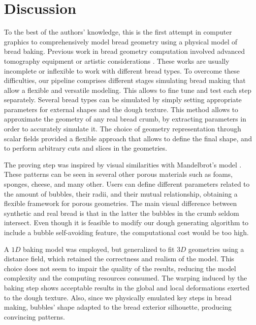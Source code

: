\section{Discussion}

To the best of the authors' knowledge, this is the first attempt in computer graphics to comprehensively model bread geometry using a physical model of bread baking.
Previous work in bread geometry computation involved advanced tomography equipment \cite{VanDyck2014} or artistic considerations \cite{Xenakis2007}.
These works are usually incomplete or inflexible to work with different bread types.
To overcome these difficulties, our pipeline comprises different stages simulating bread making that allow a flexible and versatile modeling. 
This allows to fine tune and test each step separately.
Several bread types can be simulated by simply setting appropriate parameters for external shapes and the dough texture.
This method allows to approximate the geometry of any real bread crumb, by 
extracting parameters in order to accurately simulate it.
The choice of geometry representation through scalar fields provided a flexible approach that allows to define the final shape, and to perform arbitrary cuts and slices in the geometries.

The proving step was inspired by visual similarities with Mandelbrot's model \cite{Mandelbrot1982}.
These patterns can be seen in several other porous materials such as foams, sponges, cheese, and many other.
Users can define different parameters related to the amount of bubbles, their radii, and their mutual relationship, obtaining a flexible framework for porous geometries.
The main visual difference between synthetic and real bread is that in the latter the bubbles in the crumb seldom intersect.
Even though it is feasible to modify our dough generating algorithm to include a bubble self-avoiding feature, the computational cost would be too high.

A $1D$ baking model was employed, but generalized to fit $3D$ geometries using a distance field, which retained the correctness and realism of the model.
This choice does not seem to impair the quality of the results, reducing the model complexity and the computing resources consumed. 
The warping induced by the baking step shows acceptable results in the global and local deformations exerted to the dough texture.
Also, since we physically emulated key steps in bread making, bubbles' shape adapted to the bread exterior silhouette, producing convincing patterns.

